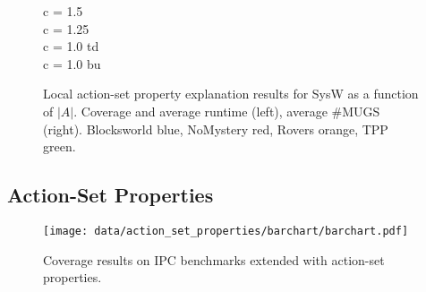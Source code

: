 \begin{figure}[h!]
\vspace{-0.2cm}
\small
\centering

c = 1.5\\

c = 1.25\\

c = 1.0 td\\

c = 1.0 bu\\

\vspace{-0.3cm}
\caption{\label{fig:asp-local} Local action-set property explanation 
results for SysW as a function of $|A|$. Coverage and average runtime
(left), average \#MUGS (right). Blocksworld blue, NoMystery red,
Rovers orange, TPP green.}
%
%
%
\vspace{-0.2cm}
\end{figure}











\ifdefined\suppflagdefined

\subsection{Action-Set Properties}

\begin{figure*}[htb]
\centering\centering
%
\texttt{[image: data/action\_set\_properties/barchart/barchart.pdf]}
\vspace{-0.6cm}
\caption{Coverage results on IPC benchmarks extended with action-set properties.}
\label{fig:barcharts}
\vspace{-0.2cm}
\end{figure*}

